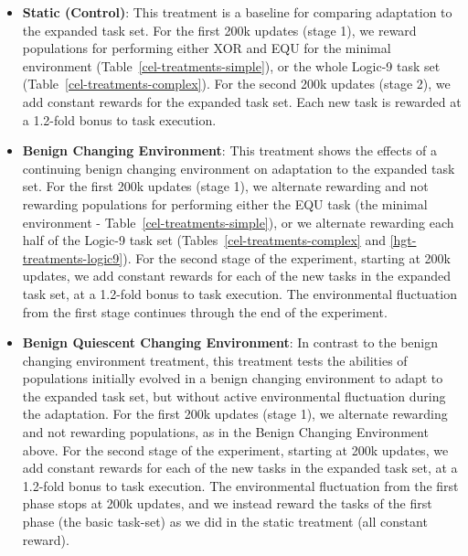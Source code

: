 \documentclass[PhD]{msu-thesis}
\begin{document}
\begin{itemize}
	\item \textbf{Static (Control)}: This treatment is a baseline for comparing adaptation to the expanded task set. For the first 200k updates (stage 1), we reward populations for performing either XOR and EQU for the minimal environment (Table~\ref{cel-treatments-simple}), or the whole Logic-9 task set (Table~\ref{cel-treatments-complex}). For the second 200k updates (stage 2), we add constant rewards for the expanded task set. Each new task is rewarded at a 1.2-fold bonus to task execution.

	\item \textbf{Benign Changing Environment}: This treatment shows the effects of a continuing benign changing environment on adaptation to the expanded task set. For the first 200k updates (stage 1), we alternate rewarding and not rewarding populations for performing either the EQU task (the minimal environment - Table~\ref{cel-treatments-simple}), or we alternate rewarding each half of the Logic-9 task set (Tables~\ref{cel-treatments-complex} and \ref{hgt-treatments-logic9}). For the second stage of the experiment, starting at 200k updates, we add constant rewards for each of the new tasks in the expanded task set, at a 1.2-fold bonus to task execution. The environmental fluctuation from the first stage continues through the end of the experiment.

	\item \textbf{Benign Quiescent Changing Environment}: In contrast to the benign changing environment treatment, this treatment tests the abilities of populations initially evolved in a benign changing environment to adapt to the expanded task set, but without active environmental fluctuation during the adaptation. For the first 200k updates (stage 1), we alternate rewarding and not rewarding populations, as in the Benign Changing Environment above. For the second stage of the experiment, starting at 200k updates, we add constant rewards for each of the new tasks in the expanded task set, at a 1.2-fold bonus to task execution. The environmental fluctuation from the first phase stops at 200k updates, and we instead reward the tasks of the first phase (the basic task-set) as we did in the static treatment (all constant reward).


\end{itemize}
\end{document}
